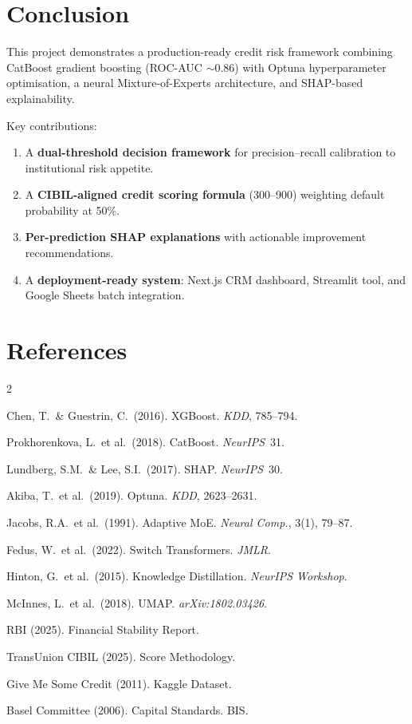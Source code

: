 \documentclass[11pt,a4paper]{article}
\begin{document}
\section{Conclusion}

This project demonstrates a production-ready credit risk framework combining CatBoost gradient boosting (ROC-AUC $\sim$0.86) with Optuna hyperparameter optimisation, a neural Mixture-of-Experts architecture, and SHAP-based explainability.

Key contributions:
\begin{enumerate}
    \item A \textbf{dual-threshold decision framework} for precision--recall calibration to institutional risk appetite.
    \item A \textbf{CIBIL-aligned credit scoring formula} (300--900) weighting default probability at 50\%.
    \item \textbf{Per-prediction SHAP explanations} with actionable improvement recommendations.
    \item A \textbf{deployment-ready system}: Next.js CRM dashboard, Streamlit tool, and Google Sheets batch integration.
\end{enumerate}


\section{References}
\begin{multicols}{2}
\footnotesize
\begin{enumerate}[label={[\arabic*]},nosep,leftmargin=*]
    \item Chen, T.\ \& Guestrin, C.\ (2016). XGBoost. \emph{KDD}, 785--794.
    \item Prokhorenkova, L.\ et al.\ (2018). CatBoost. \emph{NeurIPS}~31.
    \item Lundberg, S.M.\ \& Lee, S.I.\ (2017). SHAP. \emph{NeurIPS}~30.
    \item Akiba, T.\ et al.\ (2019). Optuna. \emph{KDD}, 2623--2631.
    \item Jacobs, R.A.\ et al.\ (1991). Adaptive MoE. \emph{Neural Comp.}, 3(1), 79--87.
    \item Fedus, W.\ et al.\ (2022). Switch Transformers. \emph{JMLR}.
    \item Hinton, G.\ et al.\ (2015). Knowledge Distillation. \emph{NeurIPS Workshop}.
    \item McInnes, L.\ et al.\ (2018). UMAP. \emph{arXiv:1802.03426}.
    \item RBI (2025). Financial Stability Report.
    \item TransUnion CIBIL (2025). Score Methodology.
    \item Give Me Some Credit (2011). Kaggle Dataset.
    \item Basel Committee (2006). Capital Standards. BIS.
\end{enumerate}
\end{multicols}
\end{document}

